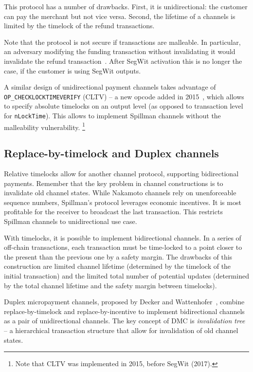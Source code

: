 This protocol has a number of drawbacks.
First, it is unidirectional: the customer can pay the merchant but not vice versa.
Second, the lifetime of a channels is limited by the timelock of the refund transactions.

Note that the protocol is not secure if transactions are malleable.
In particular, an adversary modifying the funding transaction without invalidating it would invalidate the refund transaction~\cite{Harding2016}.
After SegWit activation this is no longer the case, if the customer is using SegWit outputs.

A similar design of unidirectional payment channels takes advantage of \texttt{OP\_CHECKLOCKTIMEVERIFY} (CLTV) -- a new opcode added in 2015~\cite{Todd2014}, which allows to specify absolute timelocks on an output level (as opposed to transaction level for \texttt{nLockTime}).
This allows to implement Spillman channels without the malleability vulnerability.
\footnote{Note that CLTV was implemented in 2015, before SegWit (2017).}


\subsection{Replace-by-timelock and Duplex channels}

Relative timelocks allow for another channel protocol, supporting bidirectional payments.
Remember that the key problem in channel constructions is to invalidate old channel states.
While Nakamoto channels rely on unenforceable sequence numbers, Spillman's protocol leverages economic incentives.
It is most profitable for the receiver to broadcast the last transaction.
This restricts Spillman channels to unidirectional use case.

With timelocks, it is possible to implement bidirectional channels.
In a series of off-chain transactions, each transaction must be time-locked to a point closer to the present than the previous one by a safety margin.
The drawbacks of this construction are limited channel lifetime (determined by the timelock of the initial transaction) and the limited total number of potential updates (determined by the total channel lifetime and the safety margin between timelocks).

Duplex micropayment channels, proposed by Decker and Wattenhofer~\cite{Decker2015}, combine replace-by-timelock and replace-by-incentive to implement bidirectional channels as a pair of unidirectional channels.
The key concept of DMC is \textit{invalidation tree} -- a hierarchical transaction structure that allow for invalidation of old channel states.


